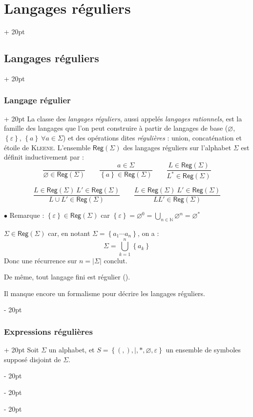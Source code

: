 \documentclass[a4paper, 12pt, twoside]{article}
\newcommand{\N}{\mathbb{N}} %
\newcommand{\set}[1]{\left\{ #1 \right\}}
\newcommand{\abs}[1]{\left\lvert #1 \right\rvert}
\newcommand{\ind}[1][20pt]{\advance\leftskip + #1}
\newcommand{\deind}[1][20pt]{\advance\leftskip - #1}
\newenvironment{indt}[2][20pt]{#2 \par \ind[#1]}{\par \deind} %
\newcommand{\Reg}{\mathsf{Reg}}
\begin{document}
\begin{indt}{\section{Langages réguliers}}
\begin{indt}{\subsection{Langages réguliers}}
            \begin{indt}{\subsubsection{Langage régulier}}
                La classe des \emph{langages réguliers}, aussi appelés \emph{langages rationnels}, est la famille des langages que l'on peut construire à partir de langages de base ($\varnothing$, $\set \varepsilon$, $\set a\ \forall a \in \Sigma$) et des opérations dites \emph{régulières} : union, concaténation et étoile de \textsc{Kleene}. L'ensemble $\Reg(\Sigma)$ des langages réguliers sur l'alphabet $\Sigma$ est définit inductivement par :
                \[
                    \dfrac{}{\varnothing \in \Reg(\Sigma)}
                    \qquad
                    \dfrac{a \in \Sigma}{\set a \in \Reg(\Sigma)}
                    \qquad
                    \dfrac{L \in \Reg(\Sigma)}{L^* \in \Reg(\Sigma)}
                \]

                \[
                    \dfrac{L \in \Reg(\Sigma)\ L' \in \Reg(\Sigma)}{L \cup L' \in \Reg(\Sigma)}
                    \qquad
                    \dfrac{L \in \Reg(\Sigma)\ L' \in \Reg(\Sigma)}{LL' \in \Reg(\Sigma)}
                \]

                \vspace{12pt}
                
                $\bullet$ Remarque : $\set \varepsilon \in \Reg(\Sigma)$ car $\set \varepsilon = \varnothing^0 = \displaystyle \bigcup_{n \in \N} \varnothing^n = \varnothing^*$

                $\Sigma \in \Reg(\Sigma)$ car, en notant $\Sigma = \set{a_1 \cdots a_n}$, on a :
                \[
                    \Sigma = \bigcup_{k = 1}^n \set{a_k}
                \]
                Donc une récurrence sur $n = \abs \Sigma$ conclut.

                De même, tout langage fini est régulier ().

                \vspace{6pt}
                
                Il manque encore un formalisme pour décrire les langages réguliers.
            \end{indt}

            \vspace{12pt}
            
            \begin{indt}{\subsubsection{Expressions régulières}}
                Soit $\Sigma$ un alphabet, et $S = \set{(, ), |, *, \varnothing, \varepsilon}$ un ensemble de symboles supposé disjoint de $\Sigma$.


\end{indt}
\end{indt}
\end{indt}
\end{document}
